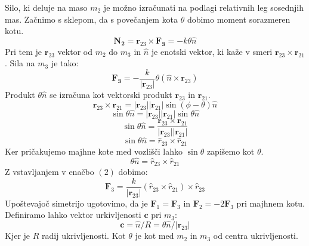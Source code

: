 Silo, ki deluje na maso $m_2$ je možno izračunati na podlagi relativnih leg sosednjih mas. Začnimo s sklepom, da s povečanjem kota $\theta$ dobimo moment sorazmeren kotu.
\begin{equation}
\mathbf{N_2} = \mathbf{r}_{23} \times \mathbf{F_3} = -k \theta \hat{n}
\end{equation}
Pri tem je $\mathbf{r}_{23}$ vektor od $m_2$ do $m_3$ in $\hat{n}$ je enotski vektor, ki kaže v smeri $\mathbf{r}_{23} \times \mathbf{r}_{21}$. Sila na $m_3$ je tako:
\begin{equation}
\mathbf{F_3} = -\frac{k}{|\mathbf{r}_{23}|}\theta(\hat{n} \times \mathbf{r}_{23})
\end{equation}
Produkt $\theta \hat{n}$ se izračuna kot vektorski produkt $\mathbf{r}_{23}$ in $\mathbf{r}_{21}$.
\begin{equation}
\mathbf{r}_{23} \times \mathbf{r}_{21} = |\mathbf{r}_{23}||\mathbf{r}_{21}| \sin(\phi - \theta) \hat{n}
\end{equation}
\begin{equation}
\sin\theta\hat{n} = |\mathbf{r}_{23}||\mathbf{r}_{21}|\sin\theta\hat{n}
\end{equation}
\begin{equation}
\sin\theta\hat{n} = \frac{\mathbf{r}_{23} \times \mathbf{r}_{21}}{|\mathbf{r}_{23}||\mathbf{r}_{21}|}
\end{equation}
\begin{equation} \label{eq:1}
\sin\theta\hat{n} = \hat{r}_{23} \times \hat{r}_{21}
\end{equation}
Ker pričakujemo majhne kote med vozlišči lahko $\sin\theta$ zapišemo kot $\theta$.
\begin{equation} \label{eq:2}
\theta\hat{n} = \hat{r}_{23} \times \hat{r}_{21}
\end{equation}
Z vstavljanjem v enačbo $(2)$ dobimo:
\begin{equation}
\mathbf{F}_3 = \frac{k}{|\mathbf{r}_{23}|}(\hat{r}_{23} \times \hat{r}_{21}) \times \hat{r}_{23}
\end{equation}
Upoštevajoč simetrijo ugotovimo, da je $\mathbf{F}_1 = \mathbf{F}_3$ in $\mathbf{F}_2 = -2\mathbf{F}_3$ pri majhnem kotu. Definiramo lahko vektor urkivljenosti $\mathbf{c}$ pri $m_3$:
\begin{equation}
\mathbf{c} = \hat{n}/R = \theta \hat{n} / |\mathbf{r}_{23}|
\end{equation}
Kjer je $R$ radij ukrivljenosti. Kot $\theta$ je kot med $m_2$ in $m_3$ od centra ukrivljenosti.


